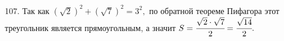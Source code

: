 107. Так как $(\sqrt{2})^2+(\sqrt{7})^2=3^2,$ по обратной теореме Пифагора этот треугольник является прямоугольным, а значит $S=\cfrac{\sqrt{2}\cdot\sqrt{7}}{2}=\cfrac{\sqrt{14}}{2}.$\\
